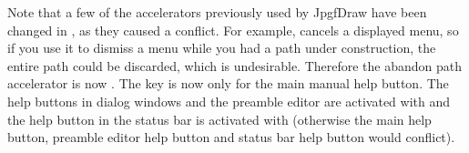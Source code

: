 \begin{warning}
Note that a few of the accelerators previously used by \gls{JpgfDraw} have
been changed in \FlowframTk, as they caused a conflict. For example,
 cancels a displayed menu, so if you use it to
dismiss a menu while you had a \gls{path} under construction, the
entire path could be discarded, which is undesirable. Therefore the
abandon path accelerator is now . The
 key is now only for the main manual help
button. The help buttons in dialog windows and the preamble editor
are activated with  and the help button in the
status bar is activated with  (otherwise
the main help button, preamble editor help button and status bar
help button would conflict).
\end{warning}


